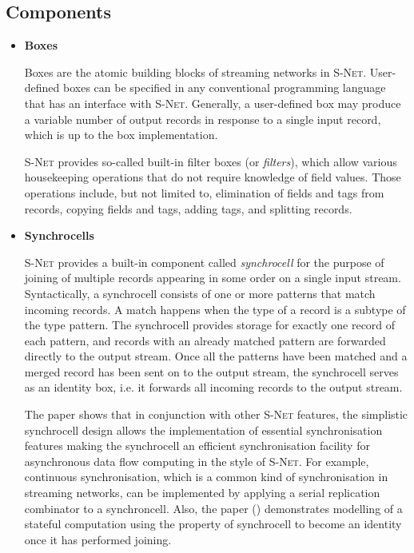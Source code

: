     \subsection*{Components}
        \begin{itemize}
        \item \textbf{Boxes}

Boxes are the atomic building blocks of streaming networks in \textsc{S-Net}. User-defined boxes can be specified in any conventional programming language that has an interface with \textsc{S-Net}. Generally, a user-defined box may produce a variable number of output records in response to a single input record, which is up to the box implementation.

\textsc{S-Net} provides so-called built-in filter boxes (or \emph{filters}), which allow various housekeeping operations that do not require knowledge of field values. Those operations include, but not limited to, elimination of fields and tags from records, copying fields and tags, adding tags, and splitting records.

        \item \textbf{Synchrocells}

\textsc{S-Net} provides a built-in component called \emph{synchrocell} for the purpose of joining of multiple records appearing in some order on a single input stream. Syntactically, a synchrocell consists of one or more patterns that match incoming records. A match happens when the type of a record is a subtype of the type pattern. The synchrocell provides storage for exactly one record of each pattern, and records with an already matched pattern are forwarded directly to the output stream. Once all the patterns have been matched and a merged record has been sent on to the output stream, the synchrocell serves as an identity box, i.e. it forwards all incoming records to the output stream.

The paper \cite{ess_sync} shows that in conjunction with other \textsc{S-Net} features, the simplistic synchrocell design allows the implementation of essential synchronisation features making the synchrocell an efficient synchronisation facility for asynchronous data flow computing in the style of \textsc{S-Net}. For example, continuous synchronisation, which is a common kind of synchronisation in streaming networks, can be implemented by applying a serial replication combinator to a synchroncell. Also, the paper (\cite{ess_sync}) demonstrates modelling of a stateful computation using the property of synchrocell to become an identity once it has performed joining.

        \end{itemize}


